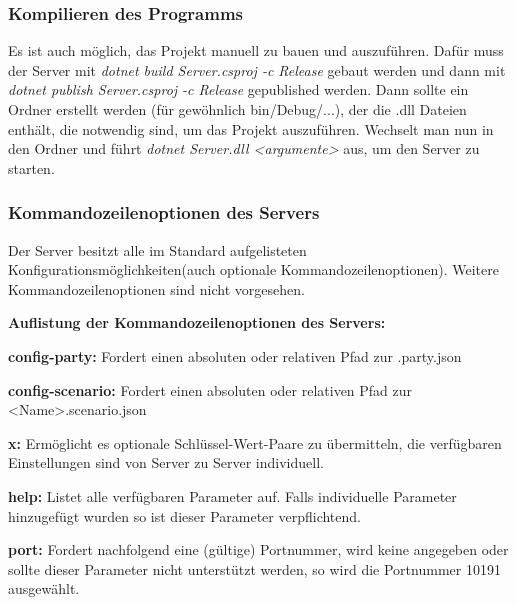 \documentclass[12pt]{article}
\newcounter{fa}
\begin{document}
\subsubsection{Kompilieren des Programms}
Es ist auch möglich, das Projekt manuell zu bauen und auszuführen. Dafür muss der Server mit \textit{dotnet build Server.csproj -c Release} gebaut werden und dann mit \textit{dotnet publish Server.csproj -c Release} gepublished
werden. Dann sollte ein Ordner erstellt werden (für gewöhnlich bin/Debug/...), der die .dll Dateien enthält, die notwendig sind, um das Projekt auszuführen.
Wechselt man nun in den Ordner und führt \textit{dotnet Server.dll <argumente>} aus, um den Server zu starten.

\subsubsection{Kommandozeilenoptionen des Servers}
Der Server besitzt alle im Standard aufgelisteten Konfigurationsmöglichkeiten(auch optionale Kommandozeilenoptionen). Weitere Kommandozeilenoptionen sind nicht vorgesehen.

\textbf{Auflistung der Kommandozeilenoptionen des Servers:}

\textbf{config-party:} Fordert einen absoluten oder relativen Pfad zur .party.json

\textbf{config-scenario:} Fordert einen absoluten oder relativen Pfad zur <Name>.scenario.json

\textbf{x:} Ermöglicht es optionale Schlüssel-Wert-Paare zu übermitteln, die verfügbaren Einstellungen sind von
Server zu Server individuell.

\textbf{help:} Listet alle verfügbaren Parameter auf. Falls individuelle Parameter hinzugefügt wurden so ist dieser Parameter verpflichtend.

\textbf{port:} Fordert nachfolgend eine (gültige) Portnummer, wird keine angegeben oder sollte dieser Parameter
nicht unterstützt werden, so wird die Portnummer 10191 ausgewählt.
\end{document}
